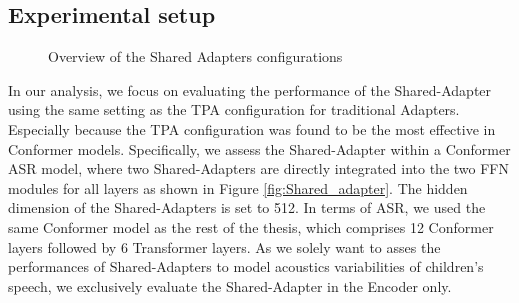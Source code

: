 \subsection{Experimental setup}
\begin{figure}[t]
    \centering
    \caption{Overview of the Shared Adapters configurations}
\end{figure}


In our analysis, we focus on evaluating the performance of the Shared-Adapter using the same setting as the \ac{TPA} configuration for traditional Adapters. Especially because the \ac{TPA} configuration was found to be the most effective in Conformer models. Specifically, we assess the Shared-Adapter within a Conformer \ac{ASR} model, where two Shared-Adapters are directly integrated into the two \ac{FFN} modules for all layers as shown in Figure \ref{fig:Shared_adapter}.  The hidden dimension of the Shared-Adapters is set to 512. In terms of \ac{ASR}, we used the same Conformer model as the rest of the thesis, which comprises 12 Conformer layers followed by 6 Transformer layers. As we solely want to asses the performances of Shared-Adapters to model acoustics variabilities of children's speech, we exclusively evaluate the Shared-Adapter in the Encoder only.

